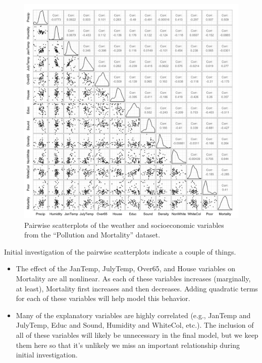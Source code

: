 \documentclass[11pt]{exam} %
\begin{document}
\begin{questions}
\begin{parts}
\begin{figure}[!h]
	\centering
	\captionsetup{width=0.8\textwidth}
	\includegraphics[width=\textwidth]{1a_pairs.png}
	\caption{Pairwise scatterplots of the weather and socioeconomic variables from the ``Pollution and Mortality'' dataset.}
	\label{fig:1a_pairs}
\end{figure}

Initial investigation of the pairwise scatterplots indicate a couple of things.
\begin{itemize}

\item The effect of the JanTemp, JulyTemp, Over65, and House variables on Mortality are all nonlinear. As each of these variables increases (marginally, at least), Mortality first increases and then decreases. Adding quadratic terms for each of these variables will help model this behavior.

\item Many of the explanatory variables are highly correlated (e.g., JanTemp and JulyTemp, Educ and Sound, Humidity and WhiteCol, etc.). The inclusion of all of these variables will likely be unnecessary in the final model, but we keep them here so that it's unlikely we miss an important relationship during initial investigation.

\end{itemize}


\end{parts}
\end{questions}
\end{document}

